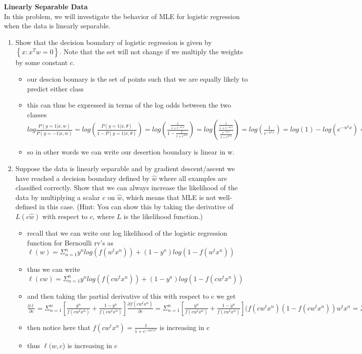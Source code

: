 \documentclass{article}
\newcommand{\nyuparagraph}[1]{\vspace{0.3cm}\textcolor{nyupurple}{\bf \large #1}\\}
\theoremstyle{plain}
\theoremstyle{definition}
\begin{document}
\newpage
\nyuparagraph{Linearly Separable Data}
\label{sec:linear}
In this problem, we will investigate the behavior of MLE for logistic regression when the data is linearly separable.

\begin{enumerate}
  \setcounter{enumi}{\value{saveenum}}
\item Show that the decision boundary of logistic regression is given by $\left\{x\colon x^Tw=0\right\}$.
Note that the set will not change if we multiply the weights by some constant $c$.
\begin{itemize}
    \color{blue}
    \item our descion bounary is the set of points such that we are equally likely to predict either class 
    \item this can thus be expressed in terms of the log odds between the two classes $log\frac{P(y=1|x,w)}{P(y=-1|x,w)}=log(\frac{P(y=1|x,\theta)}{1-P(y=1|x,\theta)})=log(\frac{\frac{1}{1+e^{-w^tx}}} {1-\frac{1}{1+e^{w^tx}}})=log(\frac{\frac{1}{1+e^{-w^tx}}} {\frac{e^{-w^tx}}{1+e^{w^tx}}})=log(\frac{1}{e^{-w^tx}})=log(1)-log(e^{-w^tx})=0-(-w^txlog(e))=w^tx$
    \item so in other words we can write our desertion boundary is linear in w. 
\end{itemize}

\item Suppose the data is linearly separable and by gradient descent/ascent we have reached a decision boundary defined by $\hat{w}$ where all examples are classified correctly. 
Show that we can always increase the likelihood of the data by multiplying a scalar $c$ on $\hat{w}$,
which means that MLE is not well-defined in this case.
{(Hint: You can show this by taking the derivative of $L(c\hat{w})$ with respect to $c$, where $L$ is the likelihood function.)}
\begin{itemize}

    \color{blue}
    \item recall that we can write our log likelihood of the logistic regression function for Bernoulli rv's as $\ell(w)=\Sigma_{n=1}^{n}y^{n}log(f(w^tx^n))+(1-y^n)log(1-f(w^tx^n))$
    \item thus we can write  $\ell(cw)=\Sigma_{n=1}^{n}y^{n}log(f(cw^tx^n))+(1-y^n)log(1-f(cw^tx^n))$
    \item and then taking the partial derivative of this with respect to c we get $\frac{\partial \ell}{\partial c}=\Sigma_{n=1}^{n}[\frac{y^n}{f(cw^tx^n)}+\frac{1-y^n}{f(cw^tx^n)}]\frac{\partial f(cw^tx^n)}{\partial c}=\Sigma_{n=1}^{n}[\frac{y^n}{f(cw^tx^n)}+\frac{1-y^n}{f(cw^tx^n)}](f(cw^tx^n)(1-f(cw^tx^n))w^tx^n=\Sigma_{n=1}^{n}(y^n-f(cw^tx^n))w^tx^n$
    \item then notice here that $f(cw^tx^n)=\frac{1}{1+e^{-cw^tx^n}}$ is increasing in c 
    \item thus $\ell(w,c$) is increasing in c 
\end{itemize}


\setcounter{saveenum}{\value{enumi}}
\end{enumerate}
\end{document}
